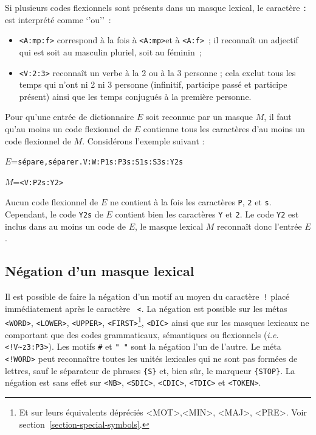 \bigskip
\noindent Si plusieurs codes flexionnels sont présents dans un masque lexical, le caractère \verb+:+ est
interprété comme `'ou''~:

\begin{itemize}
  \item \verb+<A:mp:f>+ correspond à la fois à  \verb+<A:mp>+et à \verb+<A:f>+~; il reconnaît un adjectif
  qui est soit au masculin pluriel, soit au féminin~;
  \item \verb+<V:2:3>+ reconnaît un verbe à la 2{\ieme} ou à la 3{\ieme} personne ; cela exclut tous les
  temps qui n’ont ni 2{\ieme} ni 3{\ieme} personne (infinitif, participe passé et participe présent)
  ainsi que les temps conjugués à la première personne.
\end{itemize}

\noindent Pour qu’une entrée de dictionnaire $E$ soit reconnue par un masque $M$, il faut qu’au
moins un code flexionnel de $E$ contienne tous les caractères d’au moins un code flexionnel de $M$.
Considérons l’exemple suivant :

\bigskip
$E$=\verb$sépare,séparer.V:W:P1s:P3s:S1s:S3s:Y2s$

$M$=\verb$<V:P2s:Y2>$

\bigskip
\noindent Aucun code flexionnel de $E$ ne contient à la fois les caractères \verb+P+, \verb+2+ et
\verb+s+. Cependant, le code \verb+Y2s+ de $E$ contient bien les caractères \verb+Y+ et \verb+2+. Le
code \verb+Y2+ est inclus dans au moins un code de $E$, le masque lexical $M$ reconnaît donc l’entrée $E$.


\subsection{Négation d’un masque lexical}
Il est possible de faire la négation d’un motif au moyen du caractère~\verb+!+ placé immédiatement
après le caractère ~\verb+<+. La négation est possible sur les métas \verb+<WORD>+, \verb+<LOWER>+,
\verb+<UPPER>+,
\verb+<FIRST>+\footnote{Et sur leurs équivalents dépréciés  <MOT>,<MIN>, <MAJ>,
<PRE>. Voir section~\ref{section-special-symbols}.},
\verb+<DIC>+  ainsi que sur les masques lexicaux ne comportant que des
codes grammaticaux, sémantiques ou flexionnels (\textit{i.e.} \verb$<!V~z3:P3>$). Les motifs
\verb+#+ et \verb+" "+  sont la négation l’un de l’autre.
\index{\verbt{\#}}
Le méta \verb$<!WORD>$ peut reconnaître toutes les unités lexicales qui ne sont pas formées de
lettres, sauf le séparateur de phrases \verb+{S}+ et, bien sûr, le marqueur \verb+{STOP}+.
La négation est sans effet sur \verb+<NB>+, \verb+<SDIC>+, \verb+<CDIC>+, \verb+<TDIC>+ et
\verb+<TOKEN>+.

